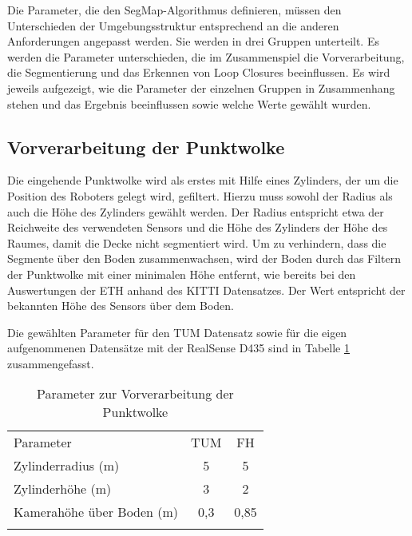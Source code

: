 Die Parameter, die den SegMap-Algorithmus definieren, müssen den Unterschieden der Umgebungsstruktur entsprechend an die anderen  Anforderungen angepasst werden. %
Sie werden in drei Gruppen unterteilt. Es werden die Parameter unterschieden, die im Zusammenspiel die Vorverarbeitung, die Segmentierung und das Erkennen von Loop Closures beeinflussen. Es wird jeweils aufgezeigt, wie die Parameter der einzelnen Gruppen in Zusammenhang stehen und das Ergebnis beeinflussen sowie welche Werte gewählt wurden. 


\subsection{Vorverarbeitung der Punktwolke}

Die eingehende Punktwolke wird als erstes mit Hilfe eines Zylinders, der um  die Position des Roboters gelegt wird, gefiltert. Hierzu muss sowohl der Radius als auch die Höhe des Zylinders gewählt werden. Der Radius entspricht etwa der Reichweite des verwendeten Sensors und die Höhe des Zylinders der Höhe des Raumes, damit die Decke nicht segmentiert wird. Um zu verhindern, dass die Segmente über den Boden zusammenwachsen, wird der Boden durch das Filtern der Punktwolke mit einer minimalen Höhe entfernt, wie bereits bei den Auswertungen der ETH anhand des KITTI Datensatzes. Der Wert entspricht der bekannten Höhe des Sensors über dem Boden.

Die gewählten Parameter für den TUM Datensatz sowie für die eigen aufgenommenen Datensätze mit der RealSense D435 sind in Tabelle \ref{Vorverarbeitung} zusammengefasst. 

\renewcommand{\arraystretch}{1}
\begin {table}[H]
 \centering
 \caption{Parameter zur Vorverarbeitung der Punktwolke}
 \label{Vorverarbeitung}
 \begin{tabular}{l c c }
  \hhline{===}
   Parameter    & TUM & FH \\
  \hhline{===}
  Zylinderradius (m) &  5   &  5  \\
  \hhline{---}\noalign{\smallskip}
  Zylinderhöhe (m) &  3   &  2  \\
  \hhline{---}\noalign{\smallskip}
  Kamerahöhe über Boden (m) &  0,3  &  0,85  \\
  \hhline{===}
 \end{tabular}
\end{table}


